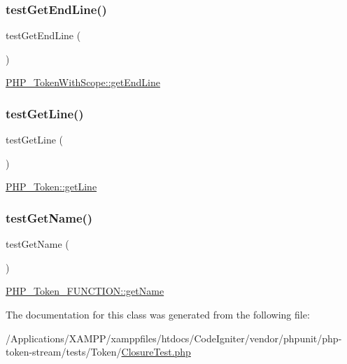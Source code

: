 \subsubsection{\texorpdfstring{test\+Get\+End\+Line()}{testGetEndLine()}}
{\footnotesize\ttfamily test\+Get\+End\+Line (\begin{DoxyParamCaption}{ }\end{DoxyParamCaption})}

\mbox{\hyperlink{class_p_h_p___token_with_scope_a7ad149e4075bba710a8933065263fe0e}{P\+H\+P\+\_\+\+Token\+With\+Scope\+::get\+End\+Line}} \mbox{\label{class_p_h_p___token___closure_test_adec279f2d758882ab4b28cd8f77a6be1}} 
\subsubsection{\texorpdfstring{test\+Get\+Line()}{testGetLine()}}
{\footnotesize\ttfamily test\+Get\+Line (\begin{DoxyParamCaption}{ }\end{DoxyParamCaption})}

\mbox{\hyperlink{class_p_h_p___token_aef9c32f6066788a101028a1d4150f8cb}{P\+H\+P\+\_\+\+Token\+::get\+Line}} \mbox{\label{class_p_h_p___token___closure_test_a20d1601e22a17dad9eb8c9050676ef70}} 
\subsubsection{\texorpdfstring{test\+Get\+Name()}{testGetName()}}
{\footnotesize\ttfamily test\+Get\+Name (\begin{DoxyParamCaption}{ }\end{DoxyParamCaption})}

\mbox{\hyperlink{class_p_h_p___token___f_u_n_c_t_i_o_n_a3d0963e68bb313b163a73f2803c64600}{P\+H\+P\+\_\+\+Token\+\_\+\+F\+U\+N\+C\+T\+I\+O\+N\+::get\+Name}} 

The documentation for this class was generated from the following file\+:\begin{DoxyCompactItemize}
\item 
/\+Applications/\+X\+A\+M\+P\+P/xamppfiles/htdocs/\+Code\+Igniter/vendor/phpunit/php-\/token-\/stream/tests/\+Token/\mbox{\hyperlink{_closure_test_8php}{Closure\+Test.\+php}}\end{DoxyCompactItemize}
